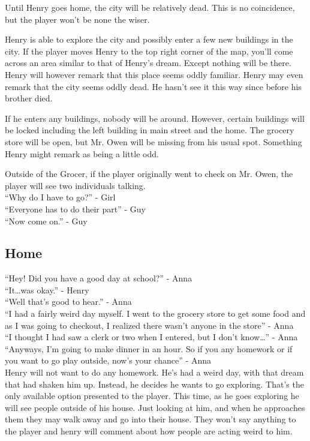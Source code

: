 \documentclass[12pt, a4paper, titlepage]{article}
\begin{document}
        Until Henry goes home, the city will be relatively dead. This is no coincidence, but the player won't be none the wiser.
        
        Henry is able to explore the city and possibly enter a few new buildings in the city. If the player moves Henry to the top right corner of the map, you'll come across an area similar
        to that of Henry's dream. Except nothing will be there. Henry will however remark that this place seems oddly familiar. Henry may even remark that the city seems oddly dead. He 
        hasn't see it this way since before his brother died.
        
        If he enters any buildings, nobody will be around. However, certain buildings will be locked including the left building in main street and the home. The grocery store will be open, but 	Mr. Owen will be missing from his usual spot. Something Henry might remark as being a little odd.
        
        Outside of the Grocer, if the player originally went to check on Mr. Owen, the player will see two individuals talking.\\

	``Why do I have to go?'' - Girl\\
	``Everyone has to do their part'' - Guy\\
	``Now come on.'' - Guy\\        

        \subsection{Home}

            ``Hey! Did you have a good day at school?'' - Anna\\
            ``It\dots was okay.'' - Henry\\
            ``Well that's good to hear.'' - Anna\\
            ``I had a fairly weird day myself. I went to the grocery store to get some food and as I was going to checkout, I realized there wasn't anyone in the store'' - Anna\\
            ``I thought I had saw a clerk or two when I entered, but I don't know\ldots'' - Anna\\
            ``Anyways, I'm going to make dinner in an hour. So if you any homework or if you want to go play outside, now's your chance'' - Anna\\

            Henry will not want to do any homework. He's had a weird day, with that dream that had shaken him up. Instead, he decides he wants to go exploring. That's the only available 		   option presented to the player. This time, as he goes exploring he will see people outside of his house. Just looking at him, and when he approaches them they may walk away 		   and go into their house. They won't say anything to the player and henry will comment about how people are acting weird to him.
            
\end{document}
